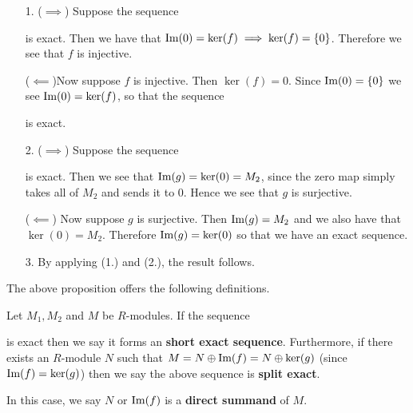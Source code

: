 \begin{prf}
    \begin{itemize}
        \item[1.]  
        ($\implies$) Suppose the sequence 
        is exact. Then we have that $\mbox{Im}(0) = \ker(f) \implies
        \ker(f) = \{0\}$. Therefore we see that $f$ is injective. 

        ($\impliedby$)Now suppose $f$ is injective. Then $\ker(f) = 0$. Since
        $\mbox{Im}(0) = \{0\}$ we see $\mbox{Im}(0) = \ker(f)$, so that the
        sequence             
        is exact.

        \item[2.] ($\implies$) Suppose the sequence 
        is exact. Then we see that $\mbox{Im}(g) = \ker(0) = M_2$, since
        the zero map simply takes all of $M_2$ and sends it to $0$.
        Hence we see that $g$ is surjective. 

        ($\impliedby$) Now suppose $g$ is surjective. Then $\mbox{Im}(g)
        = M_2$ and we also have that $\ker(0) = M_2$. Therefore
        $\mbox{Im}(g) = \ker(0)$ so that we have an exact sequence. 

        \item[3.] By applying (1.) and (2.), the result follows.
    \end{itemize}
\end{prf}

The above proposition offers the following definitions. 

\begin{definition}
    Let $M_1, M_2$ and $M$ be $R$-modules. If the sequence
    \begin{center}
    \end{center}
    is exact then we say it forms an \textbf{short exact
    sequence}. Furthermore, if there exists an $R$-module $N$ such
    that $M = N \oplus \mbox{Im}(f) = N \oplus \ker(g)$ (since $\mbox{Im}(f) =
    \ker(g)$) then we say the above sequence is \textbf{split
    exact}.

    In this case, we say $N$ or $\mbox{Im}(f)$ is a \textbf{direct   
    summand} of $M$.
\end{definition}

